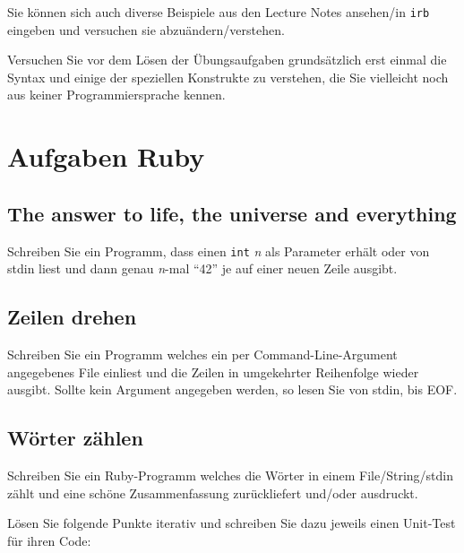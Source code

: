 \documentclass[a4paper,11pt,oneside]{scrbook}
\begin{document}
Sie können sich auch diverse Beispiele aus den Lecture Notes ansehen/in \texttt{irb} eingeben und versuchen sie abzuändern/verstehen.

Versuchen Sie vor dem Lösen der Übungsaufgaben grundsätzlich erst einmal die Syntax und einige der speziellen Konstrukte zu verstehen, die Sie vielleicht noch aus keiner Programmiersprache kennen.








\chapter{Aufgaben Ruby} %
\label{cha:Aufgaben Ruby}


\section{The answer to life, the universe and everything} %
\label{sec:the_answer_to_life_the_universe_and_everything}
Schreiben Sie ein Programm, dass einen \texttt{int} \emph{n} als Parameter erhält oder von stdin liest und dann genau \emph{n}-mal “42” je auf einer neuen Zeile ausgibt.



\section{Zeilen drehen} %
\label{sec:Zeilen drehen}
Schreiben Sie ein Programm welches ein per Command-Line-Argument angegebenes File einliest und die Zeilen in umgekehrter Reihenfolge wieder ausgibt.
Sollte kein Argument angegeben werden, so lesen Sie von stdin, bis EOF.


\section{Wörter zählen} %
\label{sec:Wörter zählen}
Schreiben Sie ein Ruby-Programm welches die Wörter in einem File/String/stdin zählt und eine schöne Zusammenfassung zurückliefert und/oder ausdruckt.

Lösen Sie folgende Punkte iterativ und schreiben Sie dazu jeweils einen Unit-Test für ihren Code:
\end{document}
